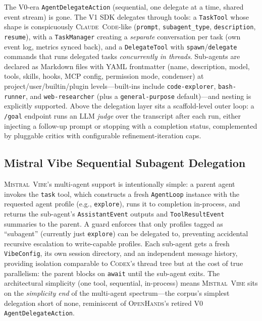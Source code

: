\documentclass[11pt,a4paper]{article}
\newcommand{\clcode}{\textsc{Claude~Code}\xspace}
\newcommand{\cdx}{\textsc{Codex}\xspace}
\newcommand{\oh}{\textsc{OpenHands}\xspace}
\newcommand{\vibe}{\textsc{Mistral~Vibe}\xspace}
\begin{document}
The V0-era \texttt{AgentDelegateAction} (sequential, one delegate at a time, shared event stream) is gone.
The V1 SDK delegates through tools: a \texttt{TaskTool} whose shape is conspicuously \clcode{}-like (\texttt{prompt}, \texttt{subagent\_type}, \texttt{description}, \texttt{resume}), with a \texttt{TaskManager} creating a \emph{separate} conversation per task (own event log, metrics synced back), and a \texttt{DelegateTool} with \texttt{spawn}/\texttt{delegate} commands that runs delegated tasks \emph{concurrently in threads}.
Sub-agents are declared as Markdown files with YAML frontmatter (name, description, model, tools, skills, hooks, MCP config, permission mode, condenser) at project/user/builtin/plugin levels---built-ins include \texttt{code-explorer}, \texttt{bash-runner}, and \texttt{web-researcher} (plus a \texttt{general-purpose} default)---and nesting is explicitly supported.
Above the delegation layer sits a scaffold-level outer loop: a \texttt{/goal} endpoint runs an LLM \emph{judge} over the transcript after each run, either injecting a follow-up prompt or stopping with a completion status, complemented by pluggable critics with configurable refinement-iteration caps.

\subsection{Mistral Vibe Sequential Subagent Delegation}

\vibe{}'s multi-agent support is intentionally simple: a parent agent invokes the \texttt{task} tool, which constructs a fresh \texttt{AgentLoop} instance with the requested agent profile (e.g., \texttt{explore}), runs it to completion in-process, and returns the sub-agent's \texttt{AssistantEvent} outputs and \texttt{ToolResultEvent} summaries to the parent.
A guard enforces that only profiles tagged as ``subagent'' (currently just \texttt{explore}) can be delegated to, preventing accidental recursive escalation to write-capable profiles.
Each sub-agent gets a fresh \texttt{VibeConfig}, its own session directory, and an independent message history, providing isolation comparable to \cdx{}'s thread tree but at the cost of true parallelism: the parent blocks on \texttt{await} until the sub-agent exits.
The architectural simplicity (one tool, sequential, in-process) means \vibe{} sits on the \emph{simplicity end} of the multi-agent spectrum---the corpus's simplest delegation short of none, reminiscent of \oh{}'s retired V0 \texttt{AgentDelegateAction}.
\end{document}
